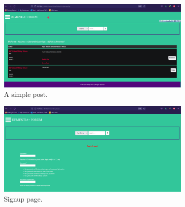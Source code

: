 \begin{figure}[!h]
	\centering
	\includegraphics[width=0.85\textwidth]{post}
	\caption{A simple post.}
	\label{fig:17}
\end{figure}

\begin{figure}[!h]
	\centering
	\includegraphics[width=0.85\textwidth]{signup}
	\caption{Signup page.}
	\label{fig:18}
\end{figure}

